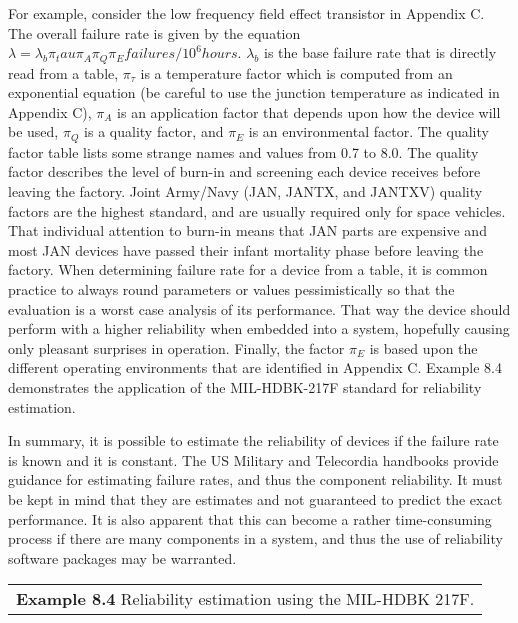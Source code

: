 {For example, consider the low frequency field effect transistor in
Appendix C. The overall failure rate is given by the equation
$\lambda=\lambda_b \pi_tau \pi_A \pi_Q \pi_E failures /10^6 hours$.
$\lambda_b$  is the base failure rate that is directly read from a table, 
 $\pi_\tau$ is a temperature factor which is computed from an 
 exponential equation (be careful to use the junction temperature 
 as indicated in Appendix C),
$\pi_A$ is an application factor that depends upon how the device 
will be used, $\pi_Q$ is a quality factor, and $\pi_E$ is an 
environmental factor. The
quality factor table lists some strange names and values from 0.7 to
8.0. The quality factor describes the level of burn-in and screening
each device receives before leaving the factory. Joint Army/Navy (JAN,
JANTX, and JANTXV) quality factors are the highest standard, and are
usually required only for space vehicles. That individual attention to
burn-in means that JAN parts are expensive and most JAN devices have
passed their infant mortality phase before leaving the factory. When
determining failure rate for a device from a table, it is common
practice to always round parameters or values pessimistically so that
the evaluation is a worst case analysis of its performance. That way the
device should perform with a higher reliability when embedded into a
system, hopefully causing only pleasant surprises in operation. Finally,
the factor $\pi_E$ is based upon the
different operating environments that are identified in Appendix C.
Example 8.4 demonstrates the application of the MIL-HDBK-217F standard
for reliability estimation.

In summary, it is possible to estimate the reliability of devices if the
failure rate is known and it is constant. The US Military and Telecordia
handbooks provide guidance for estimating failure rates, and thus the
component reliability. It must be kept in mind that they are estimates
and not guaranteed to predict the exact performance. It is also apparent
that this can become a rather time-consuming process if there are many
components in a system, and thus the use of reliability software
packages may be warranted.

\begin{table}
\begin{tabular}{m{15cm}|}
\textbf{\hfill\break Example 8.4}
Reliability estimation using the MIL-HDBK 217F. \\


\end{tabular}
\end{table}}
